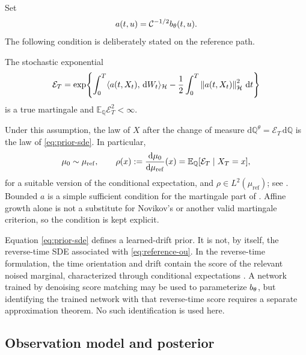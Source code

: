 Set
\[
  a(t,u)=\mathcal C^{-1/2}{b_{\theta}}(t,u).
\]
The following condition is deliberately stated on the reference path.

\begin{assumption}
\label{ass:girsanov}
The stochastic exponential
\begin{equation}
  \mathcal E_T
  =
  \exp\!\left\{
    \int_0^T\langle a(t,X_t),\,\mathrm dW_t\rangle_{\mathcal{H}}
    -\frac12\int_0^T\left\lVert a(t,X_t)\right\rVert_{\mathcal{H}}^2\,\mathrm dt
  \right\}
  \label{eq:girsanov-exponential}
\end{equation}
is a true martingale and
$\mathbb E_{\mathbb Q}\mathcal E_T^2<\infty$.
\end{assumption}

Under this assumption, the law of $X$ after the change of measure
$\mathrm d\mathbb Q^\theta=\mathcal E_T\,\mathrm d\mathbb Q$ is the
law of \eqref{eq:prior-sde}.  In particular,
\begin{equation}
  {\mu_{0}}\sim\mu_{\mathrm{ref}},\qquad
  \rho(x):=\frac{\mathrm d{\mu_{0}}}{\mathrm d\mu_{\mathrm{ref}}}(x)
  =\mathbb E_{\mathbb Q}
      [\mathcal E_T\mid X_T=x],
  \label{eq:terminal-density}
\end{equation}
for a suitable version of the conditional expectation, and
$\rho\in L^2(\mu_{\mathrm{ref}})$; see
.
Bounded $a$ is a simple sufficient condition for the martingale part of
.  Affine growth alone is not a substitute for
Novikov's or another valid martingale criterion, so the condition is
kept explicit.

\begin{remark}
\label{rem:not-reverse-score}
Equation \eqref{eq:prior-sde} defines a learned-drift prior.  It is not,
by itself, the reverse-time SDE associated with
\eqref{eq:reference-ou}.  In the reverse-time formulation, the time
orientation and drift contain the score of the relevant noised
marginal, characterized through conditional expectations
\citep{pidstrigach2023}.  A network trained by denoising score matching
may be used to parameterize ${b_{\theta}}$, but identifying the trained
network with that reverse-time score requires a separate approximation
theorem.  No such identification is used here.
\end{remark}

\subsection{Observation model and posterior}

